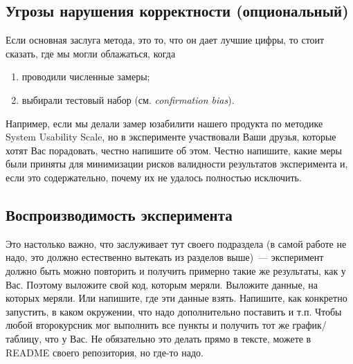 \subsection{Угрозы нарушения корректности (опциональный)}

Если основная заслуга метода, это то, что он дает лучшие цифры, то стоит сказать, где мы могли облажаться, когда
\begin{enumerate}
    \item проводили численные замеры;
    \item выбирали тестовый набор (см. \emph{confirmation bias}).
\end{enumerate}

Например, если мы делали замер юзабилити нашего продукта по методике System Usability Scale, но в эксперименте участвовали Ваши друзья, которые хотят Вас порадовать, честно напишите об этом. Честно напишите, какие меры были приняты для минимизации рисков валидности результатов эксперимента и, если это содержательно, почему их не удалось полностью исключить.

\subsection{Воспроизводимость эксперимента}

Это настолько важно, что заслуживает тут своего подраздела (в самой работе не надо, это должно естественно вытекать из разделов выше)~--- эксперимент должно быть можно повторить и получить примерно такие же результаты, как у Вас. Поэтому выложите свой код, которым меряли. Выложите данные, на которых меряли. Или напишите, где эти данные взять. Напишите, как конкретно запустить, в каком окружении, что надо дополнительно поставить и т.п. Чтобы любой второкурсник мог выполнить все пункты и получить тот же график/таблицу, что у Вас. Не обязательно это делать прямо в тексте, можете в README своего репозитория, но где-то надо.
